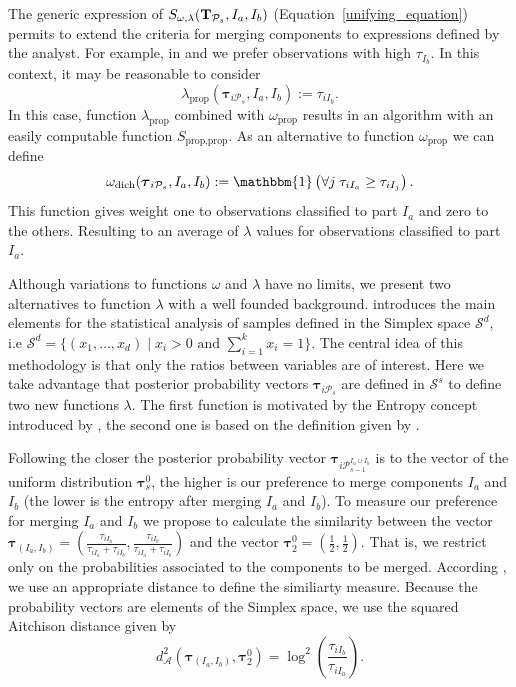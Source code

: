 \documentclass[submit]{smj}
\theoremstyle{definition}
\newcommand{\m}[1]{\boldsymbol{#1}}
\begin{document}
The generic expression of $S_{\omega, \lambda}(\text{\textbf{T}}_{\mathcal{P}_s},  I_a,  I_b)$ (Equation~\ref{unifying_equation}) permits to extend the criteria for merging components to expressions defined by the analyst. For example, in \cite{hennig2010methods} and \cite{longford2014} we prefer observations with high $\tau_{I_b}$. In this context, it may be reasonable to consider
\[
\lambda_{\text{prop}}(\m\tau_{i \mathcal{P}_s},  I_a,  I_b) := \tau_{iI_b}.
\]
In this case, function $\lambda_{\text{prop}}$ combined with $\omega_{\text{prop}}$ results in an algorithm with an easily computable function $S_{\text{prop}, \text{prop}}$. As an alternative to function $\omega_{\text{prop}}$ we can define 
\[
\omega_{\text{dich}}(\m\tau_{i \mathcal{P}_s},  I_a,  I_b) := \mathbbm{1}\left( \forall j\; \tau_{i I_{a}} \geq \tau_{iI_j} \right).
\]
This function gives weight one to observations classified to part $I_a$ and zero to the others. Resulting to an average of $\lambda$ values for observations classified to part $I_a$. 

Although variations to functions $\omega$ and $\lambda$ have no limits, we present two alternatives to function $\lambda$ with a well founded background. \cite{aitchison1986statistical} introduces the main elements for the statistical analysis of samples defined in the Simplex space $\mathcal{S}^d$, i.e $\mathcal{S}^d = \{ (x_1,\dots, x_d) \;|\; x_i > 0 \text{ and } \sum_{i=1}^k x_i = 1 \}$. The central idea of this methodology is that only the ratios between variables are of interest. Here we take advantage that posterior probability vectors $\m\tau_{i\mathcal{P}_s}$ are defined in $\mathcal{S}^s$ to define two new functions $\lambda$. The first function is motivated by the Entropy concept introduced by \cite{baudry2010combining}, the second one is based on the definition given by \cite{longford2014}.


Following \cite{baudry2010combining} the closer the posterior probability vector $\m\tau_{i \mathcal{P}_{s-1}^{I_a\cup I_b}}$ is to the vector of the uniform distribution $\m\tau_s^0$, the higher is our preference to merge components $I_a$ and $I_b$ (the lower is the entropy after merging $I_a$ and $I_b$). To measure our preference for merging $I_a$ and $I_b$ we propose to calculate the similarity between the vector $\m\tau_{\left(I_a, I_b\right)} = (\frac{\tau_{i I_a}}{\tau_{i I_a} + \tau_{i I_b}}, \frac{\tau_{i I_b}}{\tau_{i I_a} + \tau_{i I_b}})$ and the vector $\m\tau_2^0=\left(\frac{1}{2}, \frac{1}{2}\right)$. That is, we restrict only on the probabilities associated to the components to be merged. According  \cite{frey2007}, we use an appropriate distance to define the similiarty measure. Because the probability vectors are elements of the Simplex space, we use the squared Aitchison distance \citep{palarea2012dealing} given by
\[
d_\mathcal{A}^2\left(\m\tau_{\left(I_a, I_b\right)}, \m\tau_2^0 \right) = \log^2 \left(\frac{ \tau_{iI_b} }{ \tau_{iI_a} }\right).
\]
\end{document}
